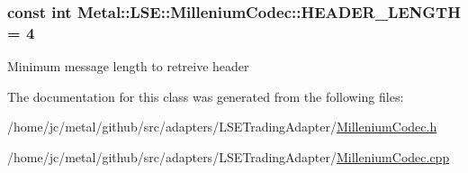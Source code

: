 \subsubsection[{H\+E\+A\+D\+E\+R\+\_\+\+L\+E\+N\+G\+T\+H}]{\setlength{\rightskip}{0pt plus 5cm}const int Metal\+::\+L\+S\+E\+::\+Millenium\+Codec\+::\+H\+E\+A\+D\+E\+R\+\_\+\+L\+E\+N\+G\+T\+H = 4\hspace{0.3cm}{\ttfamily [static]}}\label{classMetal_1_1LSE_1_1MilleniumCodec_a6bdaa076554a16c07ae8e73d6933acfd}
Minimum message length to retreive header 

The documentation for this class was generated from the following files\+:\begin{DoxyCompactItemize}
\item 
/home/jc/metal/github/src/adapters/\+L\+S\+E\+Trading\+Adapter/\hyperlink{MilleniumCodec_8h}{Millenium\+Codec.\+h}\item 
/home/jc/metal/github/src/adapters/\+L\+S\+E\+Trading\+Adapter/\hyperlink{MilleniumCodec_8cpp}{Millenium\+Codec.\+cpp}\end{DoxyCompactItemize}
